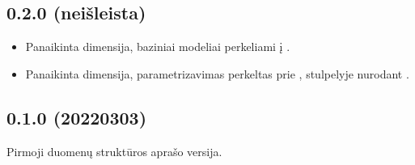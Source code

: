 \documentclass[letterpaper,10pt,lithuanian]{sphinxmanual}
\begin{document}
\subsection{0.2.0 (neišleista)}
\label{\detokenize{keitimai:neisleista}}\begin{itemize}
\item {} 
\sphinxAtStartPar
Panaikinta {\hyperref[\detokenize{dimensijos:base}]{}} dimensija, baziniai modeliai perkeliami į
{\hyperref[\detokenize{dimensijos:model.type}]{}}.

\item {} 
\sphinxAtStartPar
Panaikinta {\hyperref[\detokenize{dimensijos:param}]{}} dimensija, parametrizavimas perkeltas prie
{\hyperref[\detokenize{dimensijos:property}]{}}, {\hyperref[\detokenize{dimensijos:property.type}]{}} stulpelyje nurodant .

\end{itemize}


\subsection{0.1.0 (2022\sphinxhyphen{}03\sphinxhyphen{}03)}
\label{\detokenize{keitimai:id1}}
\sphinxAtStartPar
Pirmoji duomenų struktūros aprašo versija.
\end{document}
